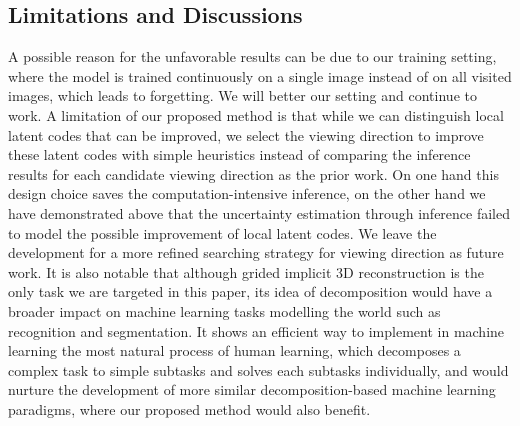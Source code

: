 \subsection{Limitations and Discussions}
A possible reason for the unfavorable results can be due to our training setting, where the model is trained continuously on a single image instead of on all visited images, which leads to forgetting.
We will better our setting and continue to work.
A limitation of our proposed method is that while we can distinguish local latent codes that can be improved, we select the viewing direction to improve these latent codes with simple heuristics instead of comparing the inference results for each candidate viewing direction as the prior work.
On one hand this design choice saves the computation-intensive inference, on the other hand we have demonstrated above that the uncertainty estimation through inference failed to model the possible improvement of local latent codes.
We leave the development for a more refined searching strategy for viewing direction as future work.
It is also notable that although grided implicit 3D reconstruction is the only task we are targeted in this paper, its idea of decomposition would have a broader impact on machine learning tasks modelling the world such as recognition and segmentation.
It shows an efficient way to implement in machine learning the most natural process of human learning, which decomposes a complex task to simple subtasks and solves each subtasks individually, and would nurture the development of more similar decomposition-based machine learning paradigms, where our proposed method would also benefit.

